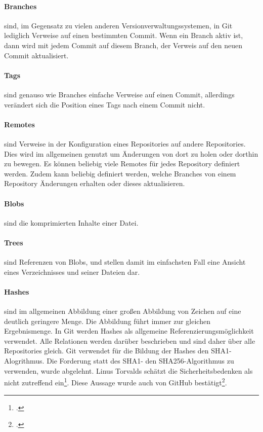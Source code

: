 \paragraph{Branches} sind, im Gegensatz zu vielen anderen Versionverwaltungssystemen, in Git lediglich Verweise auf einen 
bestimmten Commit. Wenn ein Branch aktiv ist, dann wird mit jedem Commit auf diesem Branch, der Verweis auf den neuen 
Commit aktualisiert.

\paragraph{Tags} sind genauso wie Branches einfache Verweise auf einen Commit, allerdings verändert sich die Position 
eines Tags nach einem Commit nicht.

\paragraph{Remotes} sind Verweise in der Konfiguration eines Repositories auf andere Repositories. Dies wird im 
allgemeinen genutzt um Änderungen von dort zu holen oder dorthin zu bewegen. Es können beliebig viele Remotes für jedes 
Repository definiert werden. Zudem kann beliebig definiert werden, welche Branches von einem Repository Änderungen 
erhalten oder dieses aktualisieren.

\paragraph{Blobs} sind die komprimierten Inhalte einer Datei.

\paragraph{Trees} sind Referenzen von Blobs, und stellen damit im einfachsten Fall eine Ansicht eines Verzeichnisses und 
seiner Dateien dar.

\paragraph{Hashes} sind im allgemeinen Abbildung einer großen Abbildung von Zeichen auf eine deutlich geringere Menge. 
Die Abbildung führt immer zur gleichen Ergebnismenge. In Git werden Hashes als allgemeine Referenzierungsmöglichkeit 
verwendet. Alle Relationen werden darüber beschrieben und sind daher über alle Repositories gleich. Git verwendet für die 
Bildung der Hashes den SHA1-Alogrithmus. Die Forderung statt des SHA1- den SHA256-Algorithmus zu verwenden, wurde 
abgelehnt. Linus Torvalds schätzt die Sicherheitsbedenken als nicht zutreffend ein\footcite{git-sha-torvalds}. Diese 
Aussage wurde auch von GitHub bestätigt\footcite{git-sha-github}.

